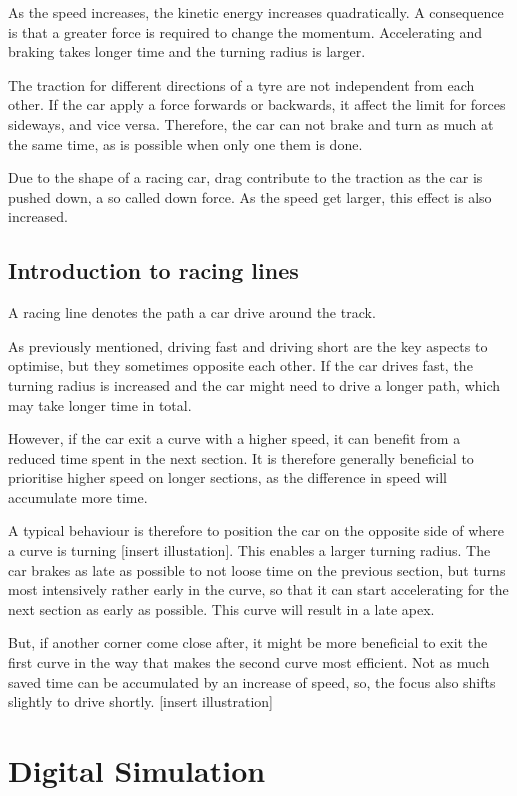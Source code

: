As the speed increases, the kinetic energy increases quadratically. A consequence is that a greater force is required to change the momentum. Accelerating and braking takes longer time and the turning radius is larger.

The traction for different directions of a tyre are not independent from each other. If the car apply a force forwards or backwards, it affect the limit for forces sideways, and vice versa. Therefore, the car can not brake and turn as much at the same time, as is possible when only one them is done.

Due to the shape of a racing car, drag contribute to the traction as the car is pushed down, a so called down force. As the speed get larger, this effect is also increased.


\subsection{Introduction to racing lines}
A racing line denotes the path a car drive around the track.

As previously mentioned, driving fast and driving short are the key aspects to optimise, but they sometimes opposite each other. If the car drives fast, the turning radius is increased and the car might need to drive a longer path, which may take longer time in total. 

However, if the car exit a curve with a higher speed, it can benefit from a reduced time spent in the next section. It is therefore generally beneficial to prioritise higher speed on longer sections, as the difference in speed will accumulate more time.

A typical behaviour is therefore to position the car on the opposite side of where a curve is turning [insert illustation]. This enables a larger turning radius. The car brakes as late as possible to not loose time on the previous section, but turns most intensively rather early in the curve, so that it can start accelerating for the next section as early as possible. This curve will result in a late apex.

But, if another corner come close after, it might be more beneficial to exit the first curve in the way that makes the second curve most efficient. Not as much saved time can be accumulated by an increase of speed, so, the focus also shifts slightly to drive shortly. [insert illustration]



\section{Digital Simulation}

